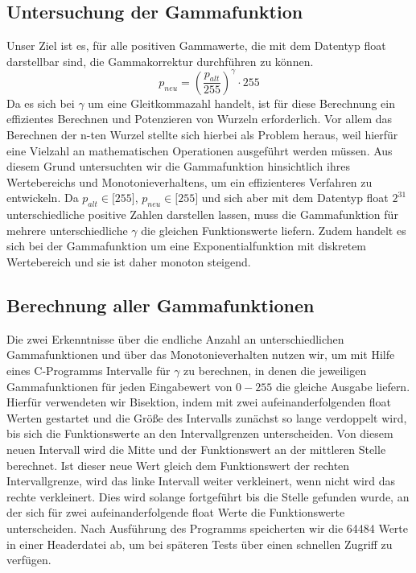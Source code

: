 \documentclass[course=erap]{aspdoc}
\begin{document}
\subsection{Untersuchung der Gammafunktion}
Unser Ziel ist es, für alle positiven Gammawerte, die mit dem Datentyp float darstellbar sind, die Gammakorrektur durchführen zu können.
\begin{equation}
p_{neu} = \left(\frac{p_{alt}}{255}\right)^{\gamma} \cdot 255
\end{equation}   
Da es sich bei $\gamma$ um eine Gleitkommazahl handelt, ist für diese Berechnung ein effizientes Berechnen und Potenzieren von Wurzeln erforderlich. Vor allem das Berechnen der n-ten Wurzel stellte sich hierbei als Problem heraus, weil hierfür eine Vielzahl an mathematischen Operationen ausgeführt werden müssen. Aus diesem Grund untersuchten wir die Gammafunktion hinsichtlich ihres Wertebereichs und Monotonieverhaltens, um ein effizienteres Verfahren zu entwickeln.
Da $p_{alt} \in \lbrack255\rbrack$, $p_{neu} \in \lbrack255\rbrack$ und sich aber mit dem Datentyp float $2^{31}$ unterschiedliche positive Zahlen darstellen lassen, muss die Gammafunktion für mehrere unterschiedliche $\gamma$ die gleichen Funktionswerte liefern.  Zudem handelt es sich bei der Gammafunktion um eine Exponentialfunktion mit diskretem Wertebereich und sie ist daher monoton steigend.

\subsection{Berechnung aller Gammafunktionen}
Die zwei Erkenntnisse über die endliche Anzahl an unterschiedlichen Gammafunktionen und über das Monotonieverhalten nutzen wir, um mit Hilfe eines C-Programms Intervalle für $\gamma$ zu berechnen, in denen die jeweiligen Gammafunktionen für jeden Eingabewert von $0-255$ die gleiche Ausgabe liefern. Hierfür verwendeten wir Bisektion, indem mit zwei aufeinanderfolgenden float Werten gestartet und die Größe des Intervalls zunächst so lange verdoppelt wird, bis sich die Funktionswerte an den Intervallgrenzen unterscheiden. Von diesem neuen Intervall wird die Mitte und der Funktionswert an der mittleren Stelle berechnet. Ist dieser neue Wert gleich dem Funktionswert der rechten Intervallgrenze, wird das linke Intervall weiter verkleinert, wenn nicht wird das rechte verkleinert. Dies wird solange fortgeführt bis die Stelle gefunden wurde, an der sich für zwei aufeinanderfolgende float Werte die Funktionswerte unterscheiden. Nach Ausführung des Programms speicherten wir die 64484 Werte in einer Headerdatei ab, um bei späteren Tests über einen schnellen Zugriff zu verfügen.         
\end{document}
